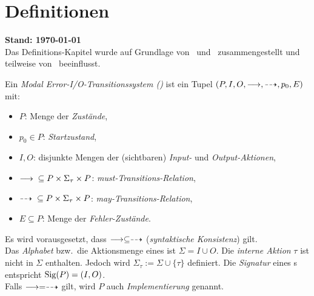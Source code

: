 \chapter{Definitionen}
{\large\textbf{Stand: \today{}}}\\

Das Definitions-Kapitel wurde auf Grundlage von~\cite{Vogler2015FailSem}
und~\cite{Schinko2016BA} zusammengestellt und teilweise
von~\cite{Vogler2016MIA3} beeinflusst.

\begin{Def}
  Ein \emph{Modal Error-I/O-Transitionssystem (\MEIO{})} ist ein Tupel
  $(P,I,O,\must,\may,p_0,E)$ mit:
  \begin{itemize}
    \item $P$: Menge der \emph{Zustände},
    \item $p_0\in P$: \emph{Startzustand},
    \item $I,O$: disjunkte Mengen der (sichtbaren) \emph{Input-} und
      \emph{Output-Aktionen},
    \item $\must{} \subseteq P\times \Sigma_{\tau}\times P$:
      \emph{must-Transitions-Relation},
    \item $\may{} \subseteq P\times \Sigma_{\tau}\times P$:
      \emph{may-Transitions-Relation},
    \item $E\subseteq P$: Menge der \emph{Fehler-Zustände}.
  \end{itemize}
  Es wird vorausgesetzt, dass $\must\subseteq\may$ (\emph{syntaktische
  Konsistenz}) gilt.\\
  Das \emph{Alphabet} bzw.\ die Aktionsmenge eines \MEIO{} ist $\Sigma = I\cup
  O$. Die \emph{interne Aktion} $\tau$ ist nicht in $\Sigma$ enthalten. Jedoch
  wird $\Sigma_{\tau} := \Sigma \cup \{\tau\}$ definiert. Die \emph{Signatur}
  eines \MEIO{}s entspricht $\mathrm{Sig} (P)=(I,O)$.\\
  Falls $\must =\may$ gilt, wird $P$ auch \emph{Implementierung} genannt.
\end{Def}

